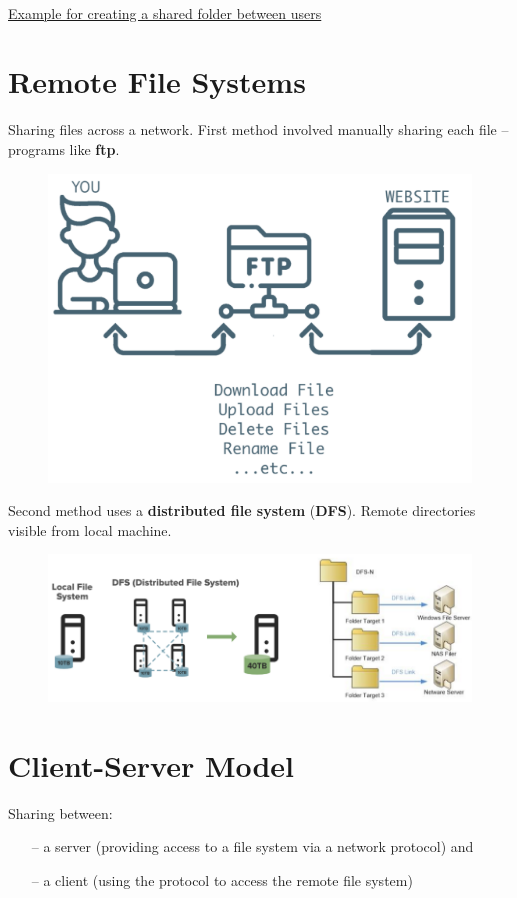 \paragraph{}

\href{https://www.geeksforgeeks.org/how-to-create-a-shared-folder-between-two-local-user-in-linux/}{Example for creating a shared folder between users} 


\section{Remote File Systems}

Sharing files across a network. First method involved manually sharing each file – programs like \textbf{ftp}.

\begin{figure}[h!]
    \centering
    \includegraphics[width=0.45\linewidth]{img/dfnnfdf.png}
\end{figure}



Second method uses a \textbf{distributed file system} (\textbf{DFS}). Remote directories visible from local machine.

\begin{figure}[h!]
    \centering
    \includegraphics[width=0.65\linewidth]{img/fsdbfbsfbs.png}
\end{figure}

\section{Client-Server Model}

Sharing between:
\begin{itemize}
    \item[--] a server (providing access to a file system via a network protocol) and
    \item[--] a client (using the protocol to access the remote file system)
\end{itemize}

